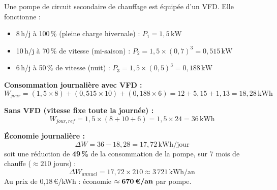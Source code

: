 \begin{exemple}[title={Choix et économie d'un VFD sur pompe secondaire}]
  Une pompe de circuit secondaire de chauffage est équipée d'un VFD. Elle fonctionne :
  \begin{itemize}
    \item 8\,h/j à 100\,\% (pleine charge hivernale) : $P_1 = 1{,}5\,\text{kW}$
    \item 10\,h/j à 70\,\% de vitesse (mi-saison) : $P_2 = 1{,}5 \times (0{,}7)^3 = 0{,}515\,\text{kW}$
    \item 6\,h/j à 50\,\% de vitesse (nuit) : $P_3 = 1{,}5 \times (0{,}5)^3 = 0{,}188\,\text{kW}$
  \end{itemize}

  \textbf{Consommation journalière avec VFD :}
  \[
    W_{jour} = (1{,}5 \times 8) + (0{,}515 \times 10) + (0{,}188 \times 6) = 12 + 5{,}15 + 1{,}13 = 18{,}28\,\text{kWh}
  \]

  \textbf{Sans VFD (vitesse fixe toute la journée) :}
  \[
    W_{jour,ref} = 1{,}5 \times (8 + 10 + 6) = 1{,}5 \times 24 = 36\,\text{kWh}
  \]

  \textbf{Économie journalière :}
  \[
    \Delta W = 36 - 18{,}28 = 17{,}72\,\text{kWh/jour}
  \]
  soit une réduction de \textbf{49\,\%} de la consommation de la pompe, sur 7 mois de chauffe ($\approx 210$ jours) :
  \[
    \Delta W_{annuel} = 17{,}72 \times 210 \approx 3\,721\,\text{kWh/an}
  \]
  Au prix de 0,18\,€/kWh : économie $\approx \textbf{670\,€/an}$ par pompe.
\end{exemple}

